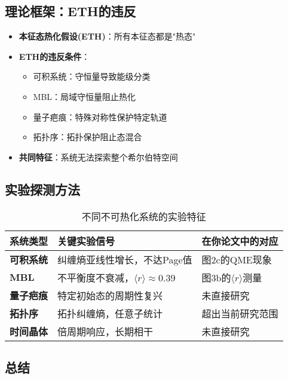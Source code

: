 \documentclass[11pt,a4paper]{article}
\begin{document}
\subsection{理论框架：ETH的违反}

\begin{itemize}
    \item \textbf{本征态热化假设(ETH)}：所有本征态都是"热态"
    \item \textbf{ETH的违反条件}：
    \begin{itemize}
        \item 可积系统：守恒量导致能级分类
        \item MBL：局域守恒量阻止热化
        \item 量子疤痕：特殊对称性保护特定轨道
        \item 拓扑序：拓扑保护阻止态混合
    \end{itemize}
    \item \textbf{共同特征}：系统无法探索整个希尔伯特空间
\end{itemize}

\subsection{实验探测方法}

\begin{table}[H]
\centering
\caption{不同不可热化系统的实验特征}
\begin{tabular}{|p{}|p{}|p{}|}
\hline
\textbf{系统类型} & \textbf{关键实验信号} & \textbf{在你论文中的对应} \\
\hline
\textbf{可积系统} & 纠缠熵亚线性增长，不达Page值 & 图2c的QME现象 \\
\hline
\textbf{MBL} & 不平衡度不衰减，$\langle r \rangle \approx 0.39$ & 图3b的$\langle r \rangle$测量 \\
\hline
\textbf{量子疤痕} & 特定初始态的周期性复兴 & 未直接研究 \\
\hline
\textbf{拓扑序} & 拓扑纠缠熵，任意子统计 & 超出当前研究范围 \\
\hline
\textbf{时间晶体} & 倍周期响应，长期相干 & 未直接研究 \\
\hline
\end{tabular}
\end{table}

\subsection{总结}
\end{document}

